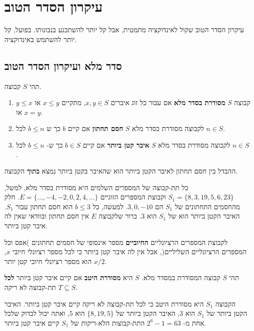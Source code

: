 
\chapter{%
עיקרון הסדר הטוב%
}\label{s.well}

עיקרון הסדר הטוב שקול לאינדוקציה מתמטית, אבל קל יותר להשתכנע בנכונותו. בפועל, קל יותר להשתמש באינדוקציה.

\section{%
סדר מלא ועיקרון הסדר הטוב%
}

\begin{definition}
תהי 
$S$
קבוצה.
\begin{enumerate}
\item
קבוצה
$S$
\textbf{מסודרת בסדר מלא}
אם עבור כל זוג איברים
$x,y\in S$,
מתקיים
$x\leq y$
או
$y \leq x$
או
$x=y$.
\item
לקבוצה מסודרת בסדר מלא
$S$
\textbf{חסם תחתון}
אם קיים
$b$
כך ש
$b\leq n$
לכל
$n\in S$.
\item
לקבוצה מסודרת בסדר מלא
$S$
\textbf{איבר קטן ביותר}
אם קיים
$b\in S$
כך ש-%
$b\leq n$
לכל
$n\in S$.
\end{enumerate}
\end{definition}
ההבדל בין חסם תחתון לאיבר הקטן ביותר הוא שהאיבר בקטן ביותר נמצא
\textbf{בתוך}
הקבוצה.

כל תת-קבוצה של המספרים השלמים היא מסודרת בסדר מלא, למשל,
$S_1=\{8,3,19,5,6,23\}$
וקבוצת המספרים הזוגיים
$E=\{\ldots, -4, -2, 0, 2, 4, \ldots\}$.
חלק מהחסמים התחתונים של
$S_1$
הם
$3, 0, -10$.
למעשה, כל
$b\leq 3$
הוא חסם תחתון עבור
$S_1$.
האיבר הקטן ביותר הוא של
$S_1$
הוא
$3$.
ברור שלקבוצה
$E$
אין חסם תחתון ובוודאי שאין לה איבר קטן ביותר.

לקבוצת המספרים הרציונליים 
\textbf{החיוביים}
מספר אינסופי של חסמים תחתונים )אפס וכל המספרים הרציונליים השליליים(, אבל אין לה איבר קטן ביותר כי לכל מספר רציונלי חיובי
$x$, $x/2$
הוא מספר רציונלי חיובי קטן יותר.

\begin{definition}
תהי 
$S$
קבוצה המסודרת במסדר מלא.
$S$
היא
\textbf{מסודרת היטב}
אם קיים איבר קטן ביותר
\textbf{לכל}
תת-קבוצה לא ריקה
$T\subseteq S$.
\end{definition}

הקבוצה
$S_1$
היא מסודרת היטב כי לכל תת-קבוצה לא ריקה קיים איבר קטן ביותר. האיבר הקטן ביותר של 
$S_1$
הוא
$3$,
האיבר הקטן ביותר של
$\{8, 19, 5\}$
הוא
$5$,
ואתה יכול לבדוק שלכל אחת מ-%
$2^6-1=63$
התת-קבוצות הלא-ריקות של
$S_1$
קיים איבר קטן ביותר.

